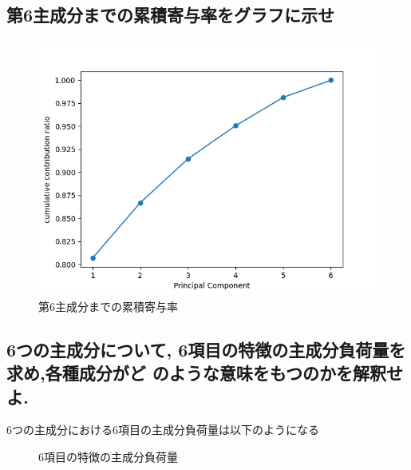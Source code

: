 \documentclass[dvipdfmx,autodetect-engine,titlepage]{jsarticle}
\begin{document}
\newpage

\subsection{第6主成分までの累積寄与率をグラフに示せ}

\begin{figure}[h]
  \centering
  \includegraphics[scale=0.7]{Figure_2.png}
  \caption{第6主成分までの累積寄与率}
\end{figure}

\subsection{6つの主成分について, 6項目の特徴の主成分負荷量を求め,各種成分がど のような意味をもつのかを解釈せよ.}

6つの主成分における6項目の主成分負荷量は以下のようになる

\begin{figure}[h]
  \centering
  \caption{6項目の特徴の主成分負荷量}
\end{figure}
\end{document}
